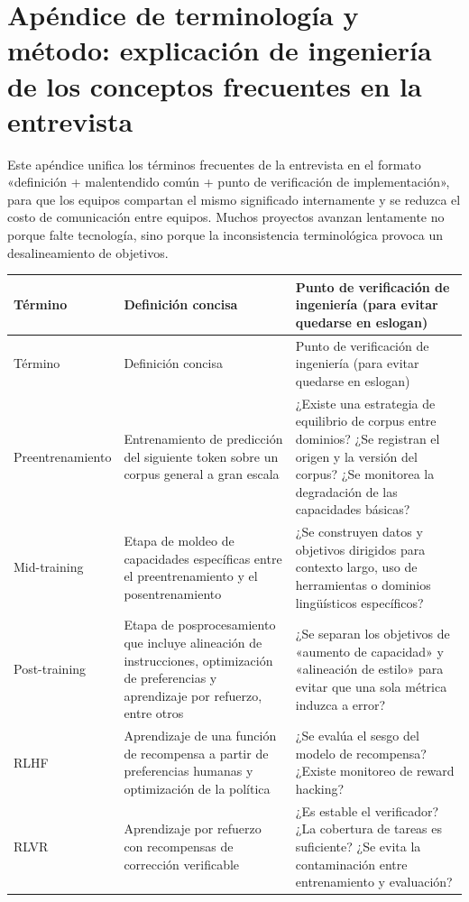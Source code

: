 \section{Apéndice de terminología y método: explicación de ingeniería de los conceptos frecuentes en la entrevista}

Este apéndice unifica los términos frecuentes de la entrevista en el formato «definición + malentendido común + punto de verificación de implementación», para que los equipos compartan el mismo significado internamente y se reduzca el costo de comunicación entre equipos. Muchos proyectos avanzan lentamente no porque falte tecnología, sino porque la inconsistencia terminológica provoca un desalineamiento de objetivos.

\begin{longtable}{p{}p{}p{}}
\toprule
Término & Definición concisa & Punto de verificación de ingeniería (para evitar quedarse en eslogan) \\
\midrule
\endfirsthead
\toprule
Término & Definición concisa & Punto de verificación de ingeniería (para evitar quedarse en eslogan) \\
\midrule
\endhead
Preentrenamiento & Entrenamiento de predicción del siguiente token sobre un corpus general a gran escala & ¿Existe una estrategia de equilibrio de corpus entre dominios? ¿Se registran el origen y la versión del corpus? ¿Se monitorea la degradación de las capacidades básicas? \\
Mid-training & Etapa de moldeo de capacidades específicas entre el preentrenamiento y el posentrenamiento & ¿Se construyen datos y objetivos dirigidos para contexto largo, uso de herramientas o dominios lingüísticos específicos? \\
Post-training & Etapa de posprocesamiento que incluye alineación de instrucciones, optimización de preferencias y aprendizaje por refuerzo, entre otros & ¿Se separan los objetivos de «aumento de capacidad» y «alineación de estilo» para evitar que una sola métrica induzca a error? \\
RLHF & Aprendizaje de una función de recompensa a partir de preferencias humanas y optimización de la política & ¿Se evalúa el sesgo del modelo de recompensa? ¿Existe monitoreo de reward hacking? \\
RLVR & Aprendizaje por refuerzo con recompensas de corrección verificable & ¿Es estable el verificador? ¿La cobertura de tareas es suficiente? ¿Se evita la contaminación entre entrenamiento y evaluación? \\

\end{longtable}
